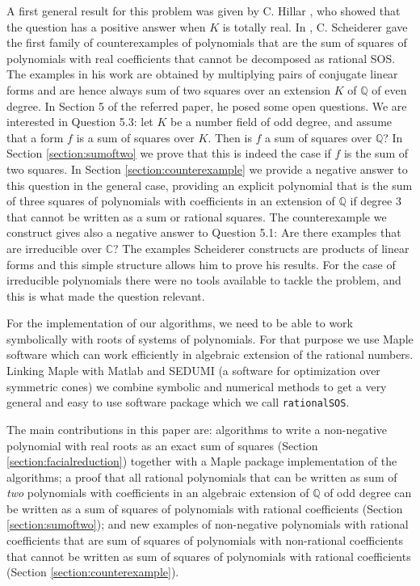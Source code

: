 \documentclass{amsart}
\theoremstyle{definition}
\theoremstyle{remark}
\numberwithin{equation}{section}
\newcommand{\C}{{\mathbb C}}
\newcommand{\Q}{{\mathbb Q}}
\begin{document}
A first general result for this problem was given by C. Hillar \cite{hillar}, who showed that the question has a positive answer when $K$ is totally real. In \cite{scheiderer}, C. Scheiderer gave the first family of counterexamples of polynomials that are the sum of squares of polynomials with real coefficients that cannot be decomposed as rational SOS. The examples in his work are obtained by multiplying pairs of conjugate linear forms and are hence always sum of two squares over an extension $K$ of $\Q$ of even degree. In Section 5 of the referred paper, he posed some open questions. We are interested in Question 5.3: let $K$ be a number field of odd degree, and assume that a form $f$ is a sum of squares over $K$. Then is $f$ a sum of squares over $\Q$?
In Section \ref{section:sumoftwo} we prove that this is indeed the case if $f$ is the sum of two squares. In Section \ref{section:counterexample} we provide a negative answer to this question in the general case, providing an explicit polynomial that is the sum of three squares of polynomials with coefficients in an extension of $\Q$ if degree 3 that cannot be written as a sum or rational squares. The counterexample we construct gives also a negative answer to Question 5.1: Are there examples that are irreducible over $\C$? The examples Scheiderer constructs are products of linear forms and this simple structure allows him to prove his results. For the case of irreducible polynomials there were no tools available to tackle the problem, and this is what made the question relevant.

For the implementation of our algorithms, we need to be able to work symbolically with roots of systems of polynomials. For that purpose we use Maple software \cite{Maple} which can work efficiently in algebraic extension of the rational numbers. Linking Maple with Matlab \cite{Matlab} and SEDUMI \cite{SEDUMI} (a software for optimization over symmetric cones) we combine symbolic and numerical methods to get a very general and easy to use software package which we call \texttt{rationalSOS}.

The main contributions in this paper are: algorithms to write a non-negative polynomial with real roots as an exact sum of squares (Section \ref{section:facialreduction}) together with a Maple package implementation of the algorithms; a proof that all rational polynomials that can be written as sum of \emph{two} polynomials with coefficients in an algebraic extension of $\Q$ of odd degree can be written as a sum of squares of polynomials with rational coefficients (Section \ref{section:sumoftwo}); and new examples of non-negative polynomials with rational coefficients that are sum of squares of polynomials with non-rational coefficients that cannot be written as sum of squares of polynomials with rational coefficients (Section \ref{section:counterexample}).
\end{document}

